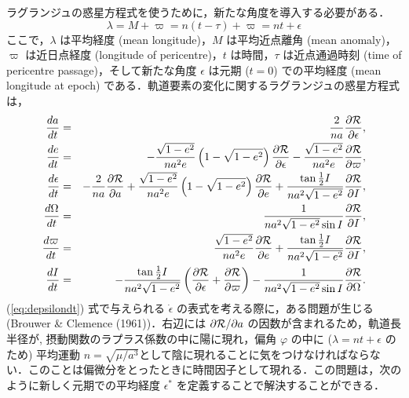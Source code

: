 \documentclass[11pt,a4paper,oneside,onecolumn]{jarticle}
\begin{document}
ラグランジュの惑星方程式を使うために，新たな角度を導入する必要がある．
\begin{equation}
\lambda = M + \varpi = n (t - \tau) + \varpi = n t + \epsilon \label{eq:lambda}
\end{equation}
ここで，$\lambda$ は平均経度 (mean longitude)，$M$ は平均近点離角 (mean anomaly)，$\varpi$ は近日点経度 (longitude of pericentre)，$t$ は時間，$\tau$ は近点通過時刻 (time of pericentre passage)，そして新たな角度 $\epsilon$ は元期 ($t = 0$) での平均経度 (mean longitude at epoch) である．軌道要素の変化に関するラグランジュの惑星方程式は，
\begin{eqnarray}
\frac{d a}{d t} & = & \frac{2}{n a} \frac{\partial {\cal R}}{\partial \epsilon}, \label{eq:dadt} \\
\frac{d e}{d t} & = & - \frac{\sqrt{1 - e^2}}{n a^2 e} \left( 1 - \sqrt{1 - e^2} \right) \frac{\partial {\cal R}}{\partial \epsilon} - \frac{\sqrt{1 - e^2}}{n a^2 e} \frac{\partial {\cal R}}{\partial \varpi}, \label{eq:dedt} \\
\frac{d \epsilon}{d t} & = & - \frac{2}{n a} \frac{\partial {\cal R}}{\partial a} + \frac{\sqrt{1 - e^2}}{n a^2 e} \left( 1 - \sqrt{1 - e^2} \right) \frac{\partial {\cal R}}{\partial e} + \frac{\tan \frac{1}{2} I}{n a^2 \sqrt{1 - e^2}} \frac{\partial {\cal R}}{\partial I}, \label{eq:depsilondt} \\
\frac{d \Omega}{d t} & = & \frac{1}{n a^2 \sqrt{1 - e^2} \sin I} \frac{\partial {\cal R}}{\partial I}, \label{eq:dOmegadt} \\
\frac{d \varpi}{d t} & = & \frac{\sqrt{1 - e^2}}{n a^2 e} \frac{\partial {\cal R}}{\partial e} + \frac{\tan \frac{1}{2} I}{n a^2 \sqrt{1 - e^2}} \frac{\partial {\cal R}}{\partial I}, \label{eq:dvarpidt} \\
\frac{d I}{d t} & = & - \frac{\tan \frac{1}{2} I}{n a^2 \sqrt{1 - e^2}} \left( \frac{\partial {\cal R}}{\partial \epsilon} + \frac{\partial {\cal R}}{\partial \varpi} \right) - \frac{1}{n a^2 \sqrt{1 - e^2} \sin I} \frac{\partial {\cal R}}{\partial \Omega}. \label{eq:dIdt}
\end{eqnarray}
(\ref{eq:depsilondt}) 式で与えられる $\dot{\epsilon}$ の表式を考える際に，ある問題が生じる (Brouwer \& Clemence (1961))．右辺には $\partial {\cal R}/\partial a$ の因数が含まれるため，軌道長半径が, 
摂動関数のラプラス係数の中に陽に現れ，偏角 $\varphi$ の中に ($\lambda = n t + \epsilon$ のため) 平均運動 $n = \sqrt{\mu /a^3}$として陰に現れることに気をつけなければならない．このことは偏微分をとったときに時間因子として現れる．この問題は，次のように新しく元期での平均経度 $\epsilon^{\ast}$ を定義することで解決することができる．
\end{document}
